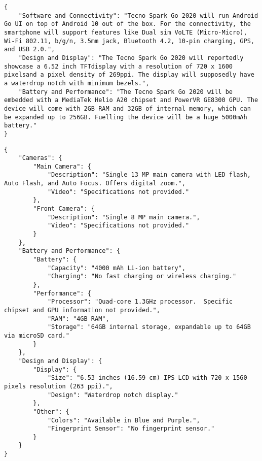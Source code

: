 \begin{figure*}
\begin{lstlisting}[style=reviews, frame = single, caption=Output generated with Mistral Instruct trained with eC-Tab2Text., label=code:JSON-Mistral-eC-Tab2Text]
{
    "Software and Connectivity": "Tecno Spark Go 2020 will run Android Go UI on top of Android 10 out of the box. For the connectivity, the smartphone will support features like Dual sim VoLTE (Micro-Micro), Wi-Fi 802.11, b/g/n, 3.5mm jack, Bluetooth 4.2, 10-pin charging, GPS, and USB 2.0.",
    "Design and Display": "The Tecno Spark Go 2020 will reportedly showcase a 6.52 inch TFTdisplay with a resolution of 720 x 1600 pixelsand a pixel density of 269ppi. The display will supposedly have a waterdrop notch with minimum bezels.",
    "Battery and Performance": "The Tecno Spark Go 2020 will be embedded with a MediaTek Helio A20 chipset and PowerVR GE8300 GPU. The device will come with 2GB RAM and 32GB of internal memory, which can be expanded up to 256GB. Fuelling the device will be a huge 5000mAh battery."
}
\end{lstlisting}
\end{figure*}
\begin{figure*}
\begin{lstlisting}[style=reviews, frame = single, caption=Output generated with Gemini1.5-flash., label=code:JSON-Gemini]
{
    "Cameras": {
        "Main Camera": {
            "Description": "Single 13 MP main camera with LED flash, Auto Flash, and Auto Focus. Offers digital zoom.",
            "Video": "Specifications not provided."
        },
        "Front Camera": {
            "Description": "Single 8 MP main camera.",
            "Video": "Specifications not provided."
        }
    },
    "Battery and Performance": {
        "Battery": {
            "Capacity": "4000 mAh Li-ion battery",
            "Charging": "No fast charging or wireless charging."
        },
        "Performance": {
            "Processor": "Quad-core 1.3GHz processor.  Specific chipset and GPU information not provided.",
            "RAM": "4GB RAM",
            "Storage": "64GB internal storage, expandable up to 64GB via microSD card."
        }
    },
    "Design and Display": {
        "Display": {
            "Size": "6.53 inches (16.59 cm) IPS LCD with 720 x 1560 pixels resolution (263 ppi).",
            "Design": "Waterdrop notch display."
        },
        "Other": {
            "Colors": "Available in Blue and Purple.",
            "Fingerprint Sensor": "No fingerprint sensor."
        }
    }
}
\end{lstlisting}
\end{figure*}
